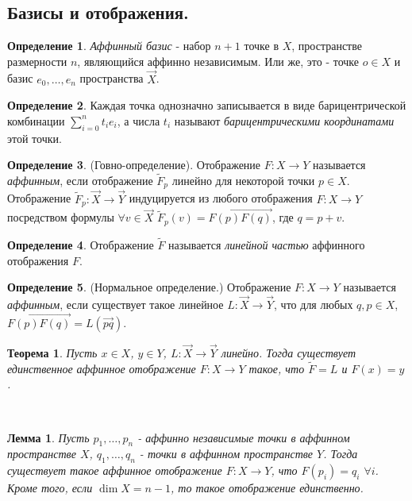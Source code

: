 \documentclass[a4paper,100pt]{article}
\theoremstyle{indented}
\newtheorem{theorem}{Теорема}
\newtheorem{lemma}{Лемма}
\theoremstyle{definition}
\newtheorem{defn}{Определение}
\theoremstyle{remark}
\DeclareMathOperator{\ra}{\rightarrow}
\begin{document}
\subsection{Базисы и отображения.}

\begin{defn}
    \textit{Аффинный базис} - набор $n+1$ точке в $X$, пространстве размерности $n$, являющийся аффинно независимым. Или же, это - точке $o\in X$ и базис $e_0, \ldots, e_n$ пространства $\vec{X}$. 
\end{defn}

\begin{defn}
    Каждая точка однозначно записывается в виде барицентрической комбинации $\sum_{i=0}^n t_i e_i$, а числа $t_i$ называют \textit{барицентрическими координатами} этой точки.
\end{defn}

\begin{defn}
    (Говно-определение). Отображение $F:X\ra Y$ называется \textit{аффинным}, если отображение $\tilde{F}_p$ линейно для некоторой точки $p\in X$. Отображение $\tilde{F}_p:\vec{X}\ra\vec{Y}$ индуцируется из любого отображения $F:X\ra Y$ посредством формулы $\forall v\in \vec{X}$ $\tilde{F}_p(v)=\overrightarrow{F(p)F(q)}$, где $q=p+v$. 
\end{defn}

\begin{defn}
    Отображение $\tilde{F}$ называется \textit{линейной частью} аффинного отображения $F$.
\end{defn}

\begin{defn}
    (Нормальное определение.) Отображение $F:X\ra Y$ называется \textit{аффинным}, если существует такое линейное $L:\vec{X}\ra\vec{Y}$, что для любых $q, p\in X$, $\overrightarrow{F(p)F(q)}=L(\vec{pq})$. 
\end{defn}

\begin{theorem}
    Пусть $x\in X$, $y\in Y$, $L:\vec{X}\ra \vec{Y}$ линейно. Тогда существует единственное аффинное отображение $F:X\ra Y$ такое, что $\tilde{F}=L$ и $F(x)=y$. 
\end{theorem} \

\begin{lemma}
    Пусть $p_1, \ldots, p_n$ - аффинно независимые точки в аффинном пространстве $X$, $q_1, \ldots, q_n$ - точки в аффинном пространстве $Y$. Тогда существует такое аффинное отображение $F:X\ra Y$, что $F(p_i)=q_i$ $\forall i$. Кроме того, если $\dim X = n-1$, то такое отображение единственно.
\end{lemma} \ 
\end{document}
